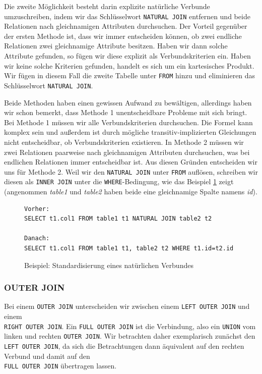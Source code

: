 Die zweite Möglichkeit besteht darin explizite natürliche Verbunde umzuschreiben, indem wir das Schlüsselwort \verb|NATURAL JOIN| entfernen und beide Relationen nach gleichnamigen Attributen durchsuchen. Der Vorteil gegenüber der  ersten Methode ist, dass wir immer entscheiden können, ob zwei endliche Relationen zwei gleichnamige Attribute besitzen. Haben wir dann solche Attribute gefunden, so fügen wir diese explizit als Verbundskriterien ein. Haben wir keine solche Kriterien gefunden, handelt es sich um ein kartesisches Produkt. Wir fügen in diesem Fall die zweite Tabelle unter \verb|FROM| hinzu und eliminieren das Schlüsselwort \verb|NATURAL JOIN|.

Beide Methoden haben einen gewissen Aufwand zu bewältigen, allerdings haben wir schon bemerkt, dass Methode 1 unentscheidbare Probleme mit sich bringt. Bei Methode 1 müssen wir alle Verbundskriterien durchsuchen. Die Formel kann komplex sein und außerdem ist durch mögliche transitiv-implizierten Gleichungen nicht entscheidbar, ob Verbundskriterien existieren. In Methode 2 müssen wir zwei Relationen paarweise nach gleichnamigen Attributen durchsuchen, was bei endlichen Relationen immer entscheidbar ist.
Aus diesen Gründen entscheiden wir uns für Methode 2. Weil wir den \verb|NATURAL JOIN| unter \verb|FROM| auflösen, schreiben wir diesen als \verb|INNER JOIN| unter die \verb|WHERE|-Bedingung, wie das  Beispiel \ref{bsp:natjoin} zeigt (angenommen \textit{table1} und \textit{table2} haben beide eine gleichnamige Spalte namens \textit{id}).

\begin{figure}[H]
\begin{verbatim}
Vorher:
SELECT t1.col1 FROM table1 t1 NATURAL JOIN table2 t2

Danach:
SELECT t1.col1 FROM table1 t1, table2 t2 WHERE t1.id=t2.id
\end{verbatim}
\caption{Beispiel: Standardisierung eines natürlichen Verbundes}
\label{bsp:natjoin}
\end{figure}

\subsubsection*{OUTER JOIN}

Bei einem \verb|OUTER JOIN| unterscheiden wir zwischen einem \verb|LEFT OUTER JOIN| und einem \\\verb|RIGHT OUTER JOIN|. Ein \verb|FULL OUTER JOIN| ist die Verbindung, also ein \verb|UNION| vom linken und rechten \verb|OUTER JOIN|. Wir betrachten daher exemplarisch zunächst den \verb|LEFT OUTER JOIN|, da sich die Betrachtungen dann äquivalent auf den rechten Verbund und damit auf den \\\verb|FULL OUTER JOIN| übertragen lassen.

